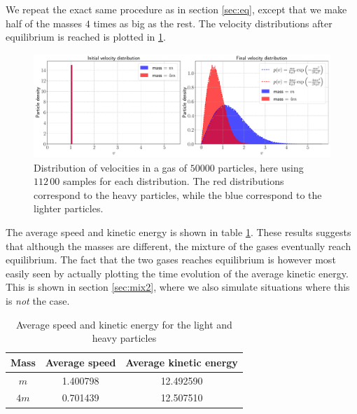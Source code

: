 We repeat the exact same procedure as in section \ref{sec:eq}, except that we make half of the masses $4$ times as big as the rest. The velocity distributions after equilibrium is reached is plotted in \ref{fig:dist_3}.

\begin{figure}[htb]
	\centering
	\includegraphics[width=\textwidth]{../fig/distribution_2}
	\caption{Distribution of velocities in a gas of $50000$ particles, here using $112\,00$ samples for each distribution. The red distributions correspond to the heavy particles, while the blue correspond to the lighter particles.}
	\label{fig:dist_3}
\end{figure}

The average speed and kinetic energy is shown in table \ref{tab:averages}. These results suggests that although the masses are different, the mixture of the gases eventually reach equilibrium. The fact that the two gases reaches equilibrium is however most easily seen by actually plotting the time evolution of the average kinetic energy. This is shown in section \ref{sec:mix2}, where we also simulate situations where this is \textit{not} the case.

\begin{table}[htb]
	\centering 
	\caption{Average speed and kinetic energy for the light and heavy particles}
	\begin{tabular}{ccc}
		\toprule
		\textbf{Mass }& \textbf{Average speed} & \textbf{Average kinetic energy} \\
		\midrule
		$m$   & 1.400798 & 12.492590 \\
		$4m$  & 0.701439 & 12.507510 \\
		\bottomrule
	\end{tabular}
	\label{tab:averages}
\end{table}
